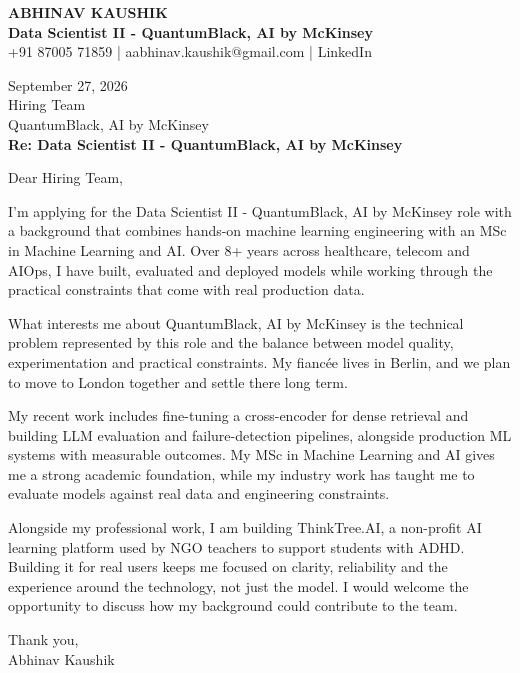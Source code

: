 \documentclass[10pt,a4paper]{article}
\begin{document}
\begin{center}
{\Large\bfseries ABHINAV KAUSHIK}\\[2pt]
{\bfseries Data Scientist II - QuantumBlack, AI by McKinsey}\\[2pt]
+91 87005 71859 \quad | \quad aabhinav.kaushik@gmail.com \quad | \quad LinkedIn
\end{center}
\vspace{8pt}
September 27, 2026\\[6pt]
Hiring Team\\
QuantumBlack, AI by McKinsey\\[4pt]
\textbf{Re: Data Scientist II - QuantumBlack, AI by McKinsey}

Dear Hiring Team,

I’m applying for the Data Scientist II - QuantumBlack, AI by McKinsey role with a background that combines hands-on machine learning engineering with an MSc in Machine Learning and AI. Over 8+ years across healthcare, telecom and AIOps, I have built, evaluated and deployed models while working through the practical constraints that come with real production data.

What interests me about QuantumBlack, AI by McKinsey is the technical problem represented by this role and the balance between model quality, experimentation and practical constraints. My fiancée lives in Berlin, and we plan to move to London together and settle there long term.

My recent work includes fine-tuning a cross-encoder for dense retrieval and building LLM evaluation and failure-detection pipelines, alongside production ML systems with measurable outcomes. My MSc in Machine Learning and AI gives me a strong academic foundation, while my industry work has taught me to evaluate models against real data and engineering constraints.

Alongside my professional work, I am building ThinkTree.AI, a non-profit AI learning platform used by NGO teachers to support students with ADHD. Building it for real users keeps me focused on clarity, reliability and the experience around the technology, not just the model. I would welcome the opportunity to discuss how my background could contribute to the team.

Thank you,\\
Abhinav Kaushik
\end{document}
